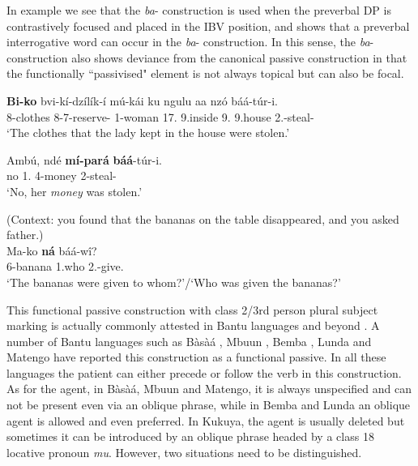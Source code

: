 \documentclass[output=paper,colorlinks,citecolor=brown,
]{langscibook}
\begin{document}
In example  we see that the \textit{ba}- construction is used when the preverbal DP is contrastively focused and placed in the IBV position, and  shows that a preverbal interrogative word can occur in the \textit{ba}- construction. In this sense, the \textit{ba}- construction also shows deviance from the canonical passive construction in that the functionally ``passivised" element is not always topical but can also be focal.  
\begin{exe}
    \ex \label{130}
    \begin{xlist}
\ex
\label{130a}
\gll
\textbf{Bi-ko} bvi-kí-dzílík-í mú-kái ku ngulu aa nzó báá-túr-i.\\
8-clothes 8\Rel{}-7\Sm{}-reserve-\Pst{} 1-woman 17.\Loc{} 9.inside 9.\Conn{} 9.house 2\Sm{}.\Pst{}-steal-\Pst{}\\
\trans ‘The clothes that the lady kept in the house were stolen.’

\ex
\label{130b}
\gll
Ambú, ndé \textbf{mí-pará} \textbf{báá}-túr-i.\\
no 1.\Pro{} 4-money 2\Sm{}-steal-\Pst{}\\
\trans ‘No, her \textit{money} was stolen.’

    \end{xlist}
\end{exe}
\begin{exe} 
\ex
\label{131}
 (Context: you found that the bananas on the table disappeared, and you asked father.)\\
\gll
Ma-ko \textbf{ná} báá-wî?\\
6-banana 1.who 2\Sm{}.\Pst{}-give.\Pst{}\\
\trans ‘The bananas were given to whom?’/‘Who was given the bananas?’

\end{exe}
This functional passive construction with class 2/3rd person plural subject marking is actually commonly attested in Bantu languages and beyond \citep{Frajzyngier1982, KeenanDryer2007, CobbinahLüpke2009}. A number of Bantu languages such as Bàsàá \citep{HamlaouiMakasso2013}, Mbuun \citep{BostoenMundeke2011}, Bemba \citep{KulaMarten2010}, Lunda \citep{Kawasha2007} and Matengo \citep{vanderWal2015} have reported this construction as a functional passive. In all these languages the patient can either precede or follow the verb in this construction. As for the agent, in Bàsàá, Mbuun and Matengo, it is always unspecified and can not be present even via an oblique phrase, while in Bemba and Lunda an oblique agent is allowed and even preferred. In Kukuya, the agent is usually deleted but sometimes it can be introduced by an oblique phrase headed by a class 18 locative pronoun \textit{mu}. However, two situations need to be distinguished.
\end{document}
